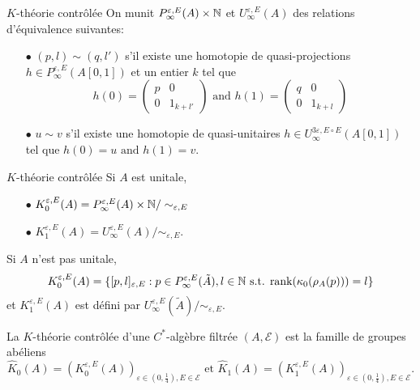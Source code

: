 \begin{frame}{$K$-théorie contrôlée}
On munit $P_\infty^{\varepsilon, E}(A)\times \mathbb N$ et $U_\infty^{\varepsilon, E}(A)$ des relations d'équivalence suivantes:
\begin{itemize}
\item[$\bullet$] $(p,l) \sim (q,l')$ s'il existe une homotopie de quasi-projections $h\in P^{\varepsilon, E}_\infty(A[0,1])$ et un entier $k$ tel que 
\[h(0)=\begin{pmatrix} p & 0 \\ 0 & 1_{k+l'} \end{pmatrix} \text{ and }
h(1)=\begin{pmatrix} q & 0 \\ 0 & 1_{k+l} \end{pmatrix}\]
\item[$\bullet$] $u \sim v$ s'il existe une homotopie de quasi-unitaires $h\in U^{3\varepsilon, E\circ E}_\infty(A[0,1])$ tel que $h(0)= u \text{ and }h(1)=v$.\\
\end{itemize}
\end{frame}

\begin{frame}{$K$-théorie contrôlée}
Si $A$ est unitale,
\begin{itemize}
\item[$\bullet$] $K_0^{\varepsilon,E}(A) = P^{\varepsilon, E}_\infty(A)\times \mathbb N / \sim_{\varepsilon,E}$ 
\item[$\bullet$] $K_1^{\varepsilon,E}(A) = U^{\varepsilon, E}_\infty(A) / \sim_{\varepsilon,E}$.
\end{itemize}

Si $A$ n'est pas unitale,  
\[K_0^{\varepsilon,E}(A) = \{[p,l]_{\varepsilon,E} : p\in P^{\varepsilon,E}_\infty (\tilde A), l\in \mathbb N \text{ s.t. rank}(\kappa_0(\rho_A(p)))=l \}\]
et $K_1^{\varepsilon,E}(A)$ est défini par $U_\infty^{\varepsilon,E}(\tilde A)/ \sim_{\varepsilon,E}$.\\

\begin{definitionfr}
La $K$-théorie contrôlée d'une $C^*$-algèbre filtrée $(A,\mathcal E)$ est la famille de groupes abéliens 
\[\hat K_0(A) = (K_0^{\varepsilon,E}(A))_{\varepsilon\in (0,\frac{1}{4}),E\in\mathcal E} \text{ et } \hat K_1(A) = (K_1^{\varepsilon,E}(A))_{\varepsilon\in (0,\frac{1}{4}),E\in\mathcal E}.\]
\end{definitionfr}
\end{frame}

